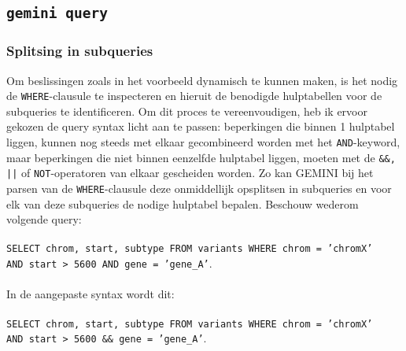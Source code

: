 \subsection{\texttt{gemini query}}
\label{gemini_query_impl}

\subsubsection{Splitsing in subqueries}

Om beslissingen zoals in het voorbeeld dynamisch te kunnen maken, is het nodig de \texttt{WHERE}-clausule te inspecteren en hieruit de benodigde hulptabellen voor de subqueries te identificeren. Om dit proces te vereenvoudigen, heb ik ervoor gekozen de query syntax licht aan te passen: beperkingen die binnen 1 hulptabel liggen, kunnen nog steeds met elkaar gecombineerd worden met het \texttt{AND}-keyword, maar beperkingen die niet binnen eenzelfde hulptabel liggen, moeten met de \texttt{\&\&, ||} of \texttt{NOT}-operatoren van elkaar gescheiden worden. Zo kan GEMINI bij het parsen van de \texttt{WHERE}-clausule deze onmiddellijk opsplitsen in subqueries en voor elk van deze subqueries de nodige hulptabel bepalen. Beschouw wederom volgende query:\\\\
\texttt{SELECT chrom, start, subtype FROM variants WHERE chrom = 'chromX' \\AND start > 5600 AND gene = 'gene\_A'}.\\\\
In de aangepaste syntax wordt dit:\\\\
\texttt{SELECT chrom, start, subtype FROM variants WHERE chrom = 'chromX' \\AND start > 5600 \&\& gene = 'gene\_A'}.\\

